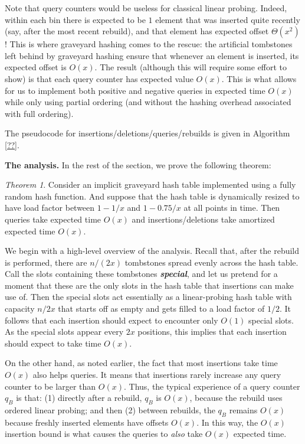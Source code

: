 \documentclass[10pt]{article}
\theoremstyle{remark}
\newtheorem{theorem}{Theorem}[section]
\theoremstyle{remark}
\newcommand{\defn}[1]{\textbf{\emph{#1}}}
\renewcommand{\paragraph}[1]{\vspace{.2 cm} \noindent \textbf{#1}}
\begin{document}
Note that query counters would be useless for classical linear probing. Indeed, within each bin there is expected to be $1$ element that was inserted quite recently (say, after the most recent rebuild), and that element has expected offset $\Theta(x^2)$! This is where graveyard hashing comes to the rescue: the artificial tombstones left behind by graveyard hashing ensure that whenever an element is inserted, its expected offset is $O(x)$. The result (although this will require some effort to show) is that each query counter has expected value $O(x)$. This is what allows for us to implement both positive and negative queries in expected time $O(x)$ while only using partial ordering (and without the hashing overhead associated with full ordering).

The pseudocode for insertions/deletions/queries/rebuilds is given in Algorithm \ref{??}.

\paragraph{The analysis.} In the rest of the section, we prove the following theorem:
\begin{theorem}
Consider an implicit graveyard hash table implemented using a fully random hash function. And suppose that the hash table is dynamically resized to have load factor between $1 - 1/x$ and $1 - 0.75/x$ at all points in time. Then queries take expected time $O(x)$ and insertions/deletions take amortized expected time $O(x)$. 
\label{thm:graveyard}
\end{theorem}

We begin with a high-level overview of the analysis. Recall that, after the rebuild is performed, there are $n/(2x)$ tombstones spread evenly across the hash table. Call the slots containing these tombstones \defn{special}, and let us pretend for a moment that these are the only slots in the hash table that insertions can make use of. Then the special slots act essentially as a linear-probing hash table with capacity $n / 2x$ that starts off as empty and gets filled to a load factor of $1/2$. It follows that each insertion should expect to encounter only $O(1)$ special slots. As the special slots appear every $2x$ positions, this implies that each insertion should expect to take time $O(x)$.  

On the other hand, as noted earlier, the fact that most insertions take time $O(x)$ also helps queries. It means that insertions rarely increase any query counter to be larger than $O(x)$. Thus, the typical experience of a query counter $q_B$ is that: (1) directly after a rebuild, $q_B$ is $O(x)$, because the rebuild uses ordered linear probing; and then (2) between rebuilds, the $q_B$ remains $O(x)$ because freshly inserted elements have offsets $O(x)$. In this way, the $O(x)$ insertion bound is what causes the queries to \emph{also} take $O(x)$ expected time.
\end{document}
